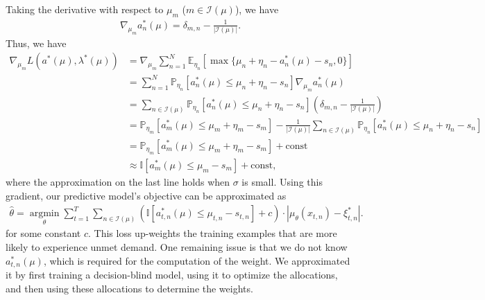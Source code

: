 \documentclass[12pt]{article}
\begin{document}
Taking the derivative with respect to $\mu_m$ ($m\in\mathcal{I}(\mu)$), we have
\begin{align*}
\nabla_{\mu_m} a^*_n(\mu) = \delta_{m,n} - \frac{1}{|\mathcal{I}(\mu)|}.
\end{align*}
Thus, we have
\begin{align*}
\nabla_{\mu_m} L(a^*(\mu),\lambda^*(\mu)) &= \nabla_{\mu_m} \sum_{n=1}^{N} \mathbb{E}_{\eta_n} \left[ \max \{\mu_n + \eta_n - a^*_n(\mu) - s_n, 0\} \right] \\
&= \sum_{n=1}^{N} \mathbb{P}_{\eta_n} \left[ a^*_n(\mu) \leq \mu_n + \eta_n - s_n \right] \nabla_{\mu_m} a^*_n(\mu) \\
&= \sum_{n\in\mathcal{I}(\mu)} \mathbb{P}_{\eta_n} \left[ a^*_n(\mu) \leq \mu_n + \eta_n - s_n \right] \left(\delta_{m,n} - \frac{1}{|\mathcal{I}(\mu)|}\right) \\
&= \mathbb{P}_{\eta_m} \left[ a^*_m(\mu) \leq \mu_m + \eta_m - s_m \right] - \frac{1}{|\mathcal{I}(\mu)|} \sum_{n\in\mathcal{I}(\mu)} \mathbb{P}_{\eta_n}[a_n^*(\mu)\le\mu_n+\eta_n-s_n] \\
&= \mathbb{P}_{\eta_m} \left[ a_m^*(\mu) \leq \mu_m + \eta_m - s_m \right] + \text{const} \\
&\approx \mathbb{I}[a_m^*(\mu) \leq \mu_m - s_m] + \text{const},
\end{align*}
where the approximation on the last line holds when $\sigma$ is small. Using this gradient, our predictive model's objective can be approximated as
\begin{align*}
\hat\theta = \operatorname*{\arg\min}_{\theta} \sum_{t=1}^T \sum_{n\in\mathcal{I}(\mu)} (\mathbb{I}[a_{t,n}^*(\mu) \leq \mu_{t,n} - s_{t,n}] + c) \cdot |\mu_{\theta}(x_{t,n}) - \xi_{t,n}^*|.
\end{align*}
for some constant $c$. This loss up-weights the training examples that are more likely to experience unmet demand. One remaining issue is that we do not know $a_{t,n}^*(\mu)$, which is required for the computation of the weight. We approximated it by first training a decision-blind model, using it to optimize the allocations, and then using these allocations to determine the weights.
\end{document}
